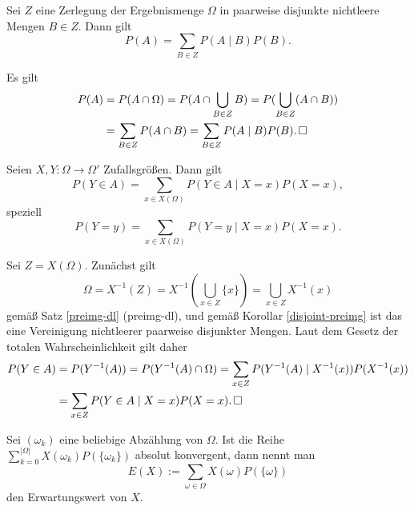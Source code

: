 \begin{Satz}%
Sei $Z$ eine Zerlegung der Ergebnismenge
$\Omega$ in paarweise disjunkte nichtleere Mengen $B\in Z$. Dann gilt
\[P(A) = \sum_{B\in Z} P(A\mid B)P(B).\]
\end{Satz}

\begin{Beweis}
Es gilt
\begin{align*}
P(A) &= P(A\cap\Omega) = P(A\cap\bigcup_{B\in Z} B)
= P(\bigcup_{B\in Z} (A\cap B))\\
&= \sum_{B\in Z} P(A\cap B)
= \sum_{B\in Z} P(A\mid B)P(B).\,\square
\end{align*}
\end{Beweis}

\begin{Korollar}%
\label{total-prob-rv}\newlinefirst
Seien $X,Y\colon\Omega\to\Omega'$ Zufallsgrößen. Dann gilt%
\[P(Y\in A) = \sum_{x\in X(\Omega)} P(Y\in A\mid X=x)P(X=x),\]
speziell
\[P(Y=y) = \sum_{x\in X(\Omega)} P(Y=y\mid X=x)P(X=x).\]
\end{Korollar}

\begin{Beweis}
Sei $Z=X(\Omega)$. Zunächst gilt
\[\Omega = X^{-1}(Z) = X^{-1}(\bigcup_{x\in Z} \{x\})
= \bigcup_{x\in Z} X^{-1}(x)\]
gemäß Satz \ref{preimg-dl} (preimg-dl), und gemäß Korollar
\ref{disjoint-preimg} ist das eine Vereinigung nichtleerer
paarweise disjunkter Mengen. Laut dem Gesetz der totalen
Wahrscheinlichkeit gilt daher%
\begin{align*}
P(Y\in A) &= P(Y^{-1}(A)) = P(Y^{-1}(A)\cap\Omega)
= \sum_{x\in Z} P(Y^{-1}(A)\mid X^{-1}(x))P(X^{-1}(x))\\
&= \sum_{x\in Z} P(Y\in A\mid X=x)P(X=x).\,\square
\end{align*}
\end{Beweis}

\begin{Definition}[Erwartungswert]%
\label{def:expected-value}\newlinefirst
Sei $(\omega_k)$ eine beliebige Abzählung von $\Omega$.
Ist die Reihe $\sum_{k=0}^{|\Omega|} X(\omega_k)P(\{\omega_k\})$
absolut konvergent, dann nennt man%
\[E(X) := \sum_{\omega\in\Omega} X(\omega)P(\{\omega\})\]
den Erwartungswert von $X$.
\end{Definition}


